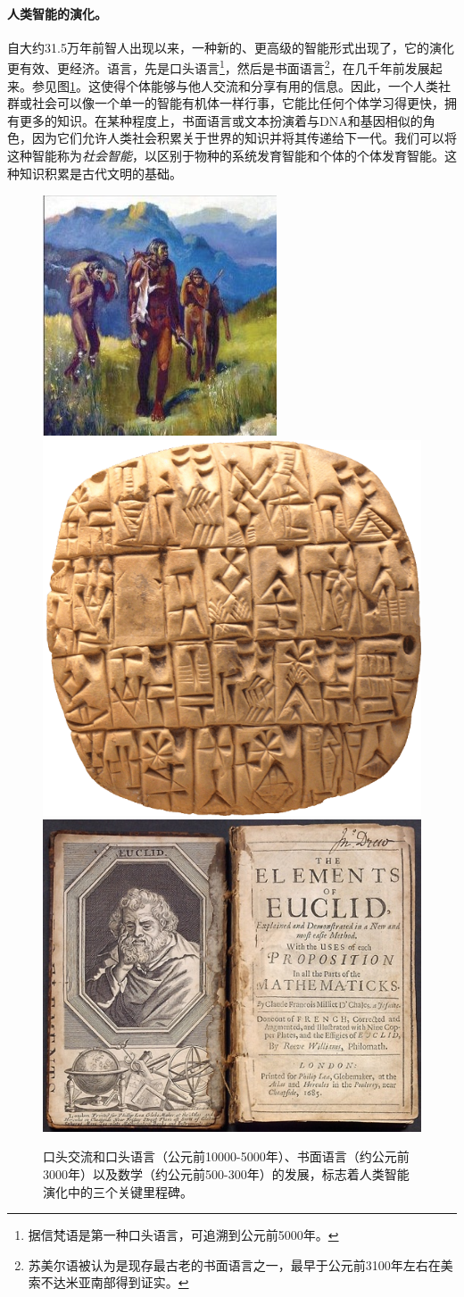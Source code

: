 \documentclass[../../book-main.tex]{subfiles}
\begin{document}
\paragraph{人类智能的演化。}
自大约31.5万年前智人出现以来，一种新的、更高级的智能形式出现了，它的演化更有效、更经济。语言，先是口头语言\footnote{据信梵语是第一种口头语言，可追溯到公元前5000年。}，然后是书面语言\footnote{苏美尔语被认为是现存最古老的书面语言之一，最早于公元前3100年左右在美索不达米亚南部得到证实。}，在几千年前发展起来。参见图\ref{fig:human-intelligence}。这使得个体能够与他人交流和分享有用的信息。因此，一个人类社群或社会可以像一个单一的智能有机体一样行事，它能比任何个体学习得更快，拥有更多的知识。在某种程度上，书面语言或文本扮演着与DNA和基因相似的角色，因为它们允许人类社会积累关于世界的知识并将其传递给下一代。我们可以将这种智能称为{\em 社会智能}，以区别于物种的系统发育智能和个体的个体发育智能。这种知识积累是古代文明的基础。
\begin{figure}
    \centering
    \includegraphics[height=0.25\linewidth]{figs_chap1/Spoken-language.jpg}
   \hspace{5mm} \includegraphics[height=0.25\linewidth]{figs_chap1/Cuneiform.png}
   \hspace{5mm} \includegraphics[height=0.25\linewidth]{figs_chap1/adopt-euclid1685-2.jpg}
    \caption{口头交流和口头语言（公元前10000-5000年）、书面语言（约公元前3000年）以及数学（约公元前500-300年）的发展，标志着人类智能演化中的三个关键里程碑。}
    \label{fig:human-intelligence}
\end{figure}
\end{document}
